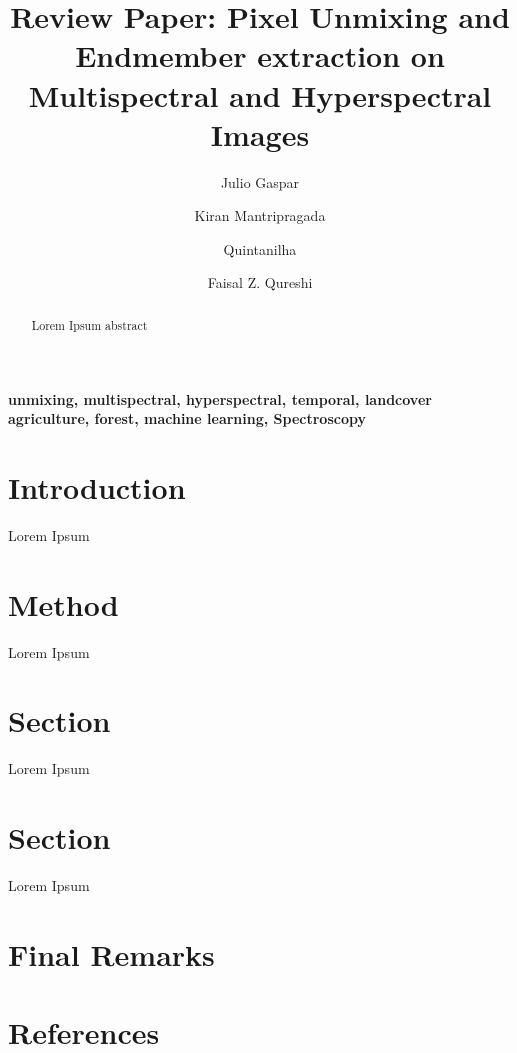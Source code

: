 \documentclass[review]{elsarticle}
\begin{document}
\begin{frontmatter}

\title{Review Paper: Pixel Unmixing and Endmember extraction on Multispectral and Hyperspectral Images}


\author[address_1, address_2]{Julio Gaspar}

\author[address_2]{Kiran Mantripragada}

\author[address_1]{Quintanilha}

\author[address_2]{Faisal Z. Qureshi}


\address[address_1]{Politechnic School of University of São Paulo, Department of Civil Engineering}
\address[address_2]{Ontario Tech University, Faculty of Sciences, Computer Vision Lab}


\begin{abstract}
    Lorem Ipsum abstract
\end{abstract}

\begin{keyword}
    \textbf{unmixing, multispectral, hyperspectral, temporal, landcover
    agriculture, forest, machine learning, Spectroscopy}
\end{keyword}

\end{frontmatter}

\linenumbers

\section{Introduction}
Lorem Ipsum


\section{Method}
Lorem Ipsum


\section{Section}
Lorem Ipsum


\section{Section}
Lorem Ipsum

\section{Final Remarks}


\nocite{*}
\section*{References}


\end{document}

